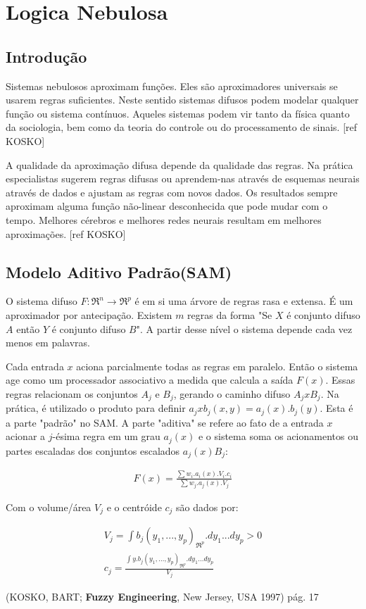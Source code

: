\section{Logica Nebulosa} 

\subsection{Introdução}

Sistemas nebulosos aproximam funções. Eles são aproximadores universais se usarem regras suficientes. 
Neste sentido sistemas difusos podem modelar qualquer função ou sistema contínuos. Aqueles sistemas podem 
vir tanto da física quanto da sociologia, bem como da teoria do controle ou do processamento de sinais.
[ref KOSKO]

A qualidade da aproximação difusa depende da qualidade das regras. Na prática especialistas sugerem regras
difusas ou aprendem-nas através de esquemas neurais através de dados e ajustam as regras com novos dados.
Os resultados sempre aproximam alguma função não-linear desconhecida que pode mudar com o tempo. Melhores 
cérebros e melhores redes neurais resultam em melhores aproximações. [ref KOSKO]

\subsection{Modelo Aditivo Padrão(SAM)}

O sistema difuso $F:\Re^n \rightarrow \Re^p$ é em si uma árvore de regras rasa e extensa. É um aproximador
por antecipação. Existem $m$ regras da forma "Se $X$ é conjunto difuso $A$ então $Y$ é conjunto difuso $B$".
A partir desse nível o sistema depende cada vez menos em palavras. 

Cada entrada $x$ aciona parcialmente todas as regras em paralelo. Então o sistema age como um processador 
associativo a medida que calcula a saída
$F(x)$. 
Essas regras relacionam os conjuntos $A_j$ e $B_j$, gerando o caminho difuso $A_j x B_j$. Na prática,
é utilizado o produto para definir $ a_j x b_j (x,y) = a_j(x).b_j(y)$. Esta é a parte "padrão" no SAM.
A parte "aditiva" se refere ao fato de a entrada $x$ acionar a $j$-ésima regra em um grau $a_j(x)$ e o sistema 
soma os acionamentos ou partes escaladas dos conjuntos escalados $a_j(x)B_j$:

\begin{eqnarray}
F(x) = \frac{\sum w_i.a_i(x).V_i.c_i}{\sum w_j.a_j(x).V_j}
\end{eqnarray}

Com o volume/área $V_j$ e o centróide $c_j$ são dados por:

\begin{eqnarray}
V_j = \int{b_j(y_1,...,y_p)}_{\Re^{p}}.dy_1...dy_p > 0\\
c_j = \frac{\int{y.b_j(y_1,...,y_p)}_{\Re^{p}}.dy_1...dy_p}{V_j}
\end{eqnarray}



(KOSKO, BART; \textbf{Fuzzy Engineering}, New Jersey, USA 1997) pág. 17
